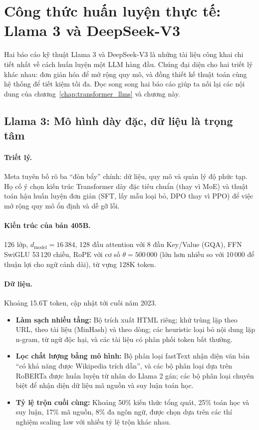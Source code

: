 
\section{Công thức huấn luyện thực tế: Llama 3 và DeepSeek-V3}
\label{sec:pretraining_case_studies}

Hai báo cáo kỹ thuật Llama 3 \cite{grattafiori2024llama3} và DeepSeek-V3 \cite{deepseekai2024v3} là những tài liệu công khai chi tiết nhất về cách huấn luyện một LLM hàng đầu. Chúng đại diện cho hai triết lý khác nhau: đơn giản hóa để mở rộng quy mô, và đồng thiết kế thuật toán cùng hệ thống để tiết kiệm tối đa. Đọc song song hai báo cáo giúp ta nối lại các nội dung của chương~\ref{chap:transformer_llms} và chương này.

\subsection{Llama 3: Mô hình dày đặc, dữ liệu là trọng tâm}
\label{ssec:llama3_recipe}

\paragraph{Triết lý.} Meta tuyên bố rõ ba “đòn bẩy” chính: dữ liệu, quy mô và quản lý độ phức tạp. Họ cố ý chọn kiến trúc Transformer dày đặc tiêu chuẩn (thay vì MoE) và thuật toán hậu huấn luyện đơn giản (SFT, lấy mẫu loại bỏ, DPO thay vì PPO) để việc mở rộng quy mô ổn định và dễ gỡ lỗi.

\paragraph{Kiến trúc của bản 405B.} 126 lớp, $d_{\text{model}} = 16\,384$, 128 đầu attention với 8 đầu Key/Value (GQA), FFN SwiGLU 53\,120 chiều, RoPE với cơ số $\theta = 500\,000$ (lớn hơn nhiều so với 10\,000 để thuận lợi cho ngữ cảnh dài), từ vựng 128K token.

\paragraph{Dữ liệu.} Khoảng 15.6T token, cập nhật tới cuối năm 2023.
\begin{itemize}
	\item \textbf{Làm sạch nhiều tầng:} Bộ trích xuất HTML riêng; khử trùng lặp theo URL, theo tài liệu (MinHash) và theo dòng; các heuristic loại bỏ nội dung lặp n-gram, từ ngữ độc hại, và các tài liệu có phân phối token bất thường.
	\item \textbf{Lọc chất lượng bằng mô hình:} Bộ phân loại fastText nhận diện văn bản “có khả năng được Wikipedia trích dẫn”, và các bộ phân loại dựa trên RoBERTa được huấn luyện từ nhãn do Llama 2 gán; các bộ phân loại chuyên biệt để nhận diện dữ liệu mã nguồn và suy luận toán học.
	\item \textbf{Tỷ lệ trộn cuối cùng:} Khoảng 50\% kiến thức tổng quát, 25\% toán học và suy luận, 17\% mã nguồn, 8\% đa ngôn ngữ, được chọn dựa trên các thí nghiệm scaling law với nhiều tỷ lệ trộn khác nhau.
\end{itemize}

